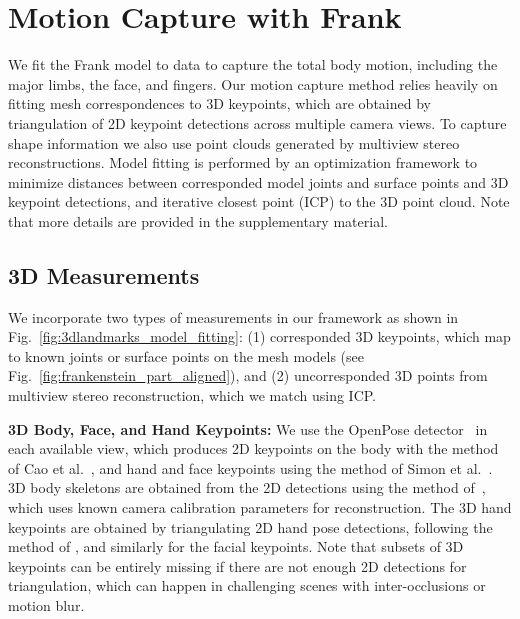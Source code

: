 

\section{Motion Capture with Frank}

We fit the Frank model to data to capture the total body motion, including the major limbs, the face, and fingers. Our motion capture method relies heavily on fitting mesh correspondences to 3D keypoints, which are obtained by triangulation of 2D keypoint detections across multiple camera views. To capture shape information we also use point clouds generated by multiview stereo reconstructions. Model fitting is performed by an optimization framework to minimize distances between corresponded model joints and surface points and 3D keypoint detections, and iterative closest point (ICP) to the 3D point cloud. Note that more details are provided in the supplementary material.

\subsection{3D Measurements}
\label{subsection:landmark_reconstruction}
We incorporate two types of measurements in our framework as shown in Fig.~\ref{fig:3dlandmarks_model_fitting}: (1) corresponded 3D keypoints, which map to known joints or surface points on the mesh models (see Fig.~\ref{fig:frankenstein_part_aligned}), and (2) uncorresponded 3D points from multiview stereo reconstruction, which we match using ICP. 


\textbf{3D Body, Face, and Hand Keypoints:}  We use the OpenPose detector~\cite{openpose} in each available view, which produces 2D keypoints on the body with the method of Cao et al.~\cite{cao2017realtime}, and hand and face keypoints using the method of Simon et al.~\cite{simon2017hand}. 3D body skeletons are obtained from the 2D detections using the method of~\cite{joo2017panoptic}, which uses known camera calibration parameters for reconstruction. The 3D hand keypoints are obtained by triangulating 2D hand pose detections, following the method of \cite{simon2017hand}, and similarly for the facial keypoints. Note that subsets of 3D keypoints can be entirely missing if there are not enough 2D detections for triangulation, which can happen in challenging scenes with inter-occlusions or motion blur. 

